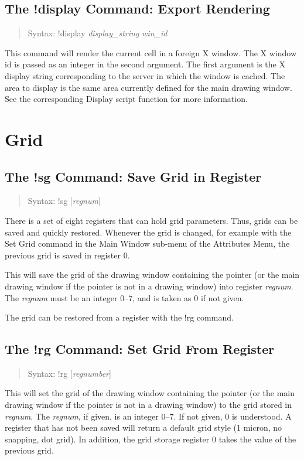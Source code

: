 \subsection{The {\cb !display} Command: Export Rendering}
\begin{quote}
Syntax: {\vt !display {\it display\_string} {\it win\_id}}
\end{quote}
This command will render the current cell in a foreign X window.  The
X window id is passed as an integer in the second argument.  The first
argument is the X display string corresponding to the server in which
the window is cached.  The area to display is the same area currently
defined for the main drawing window.  See the corresponding {\vt
Display} script function for more information.


\section{Grid}

\subsection{The {\cb !sg} Command: Save Grid in Register}
\begin{quote}
Syntax: {\vt !sg [{\it regnum\/}]} \\
\end{quote}
There is a set of eight registers that can hold grid parameters. 
Thus, grids can be saved and quickly restored.  Whenever the grid is
changed, for example with the {\cb Set Grid} command in the {\cb Main
Window} sub-menu of the {\cb Attributes Menu}, the previous grid is
saved in register 0.

This will save the grid of the drawing window containing the pointer
(or the main drawing window if the pointer is not in a drawing window)
into register {\it regnum}.  The {\it regnum} must be an integer 0--7,
and is taken as 0 if not given.

The grid can be restored from a register with the {\cb !rg} command.

\subsection{The {\cb !rg} Command: Set Grid From Register}
\begin{quote}
Syntax: {\vt !rg} [{\it regnumber}]
\end{quote}
This will set the grid of the drawing window containing the pointer
(or the main drawing window if the pointer is not in a drawing window)
to the grid stored in {\it regnum}.  The {\it regnum}, if given, is an
integer 0--7.  If not given, 0 is understood.  A register that has not
been saved will return a default grid style (1 micron, no snapping,
dot grid).  In addition, the grid storage register 0 takes the value
of the previous grid.

